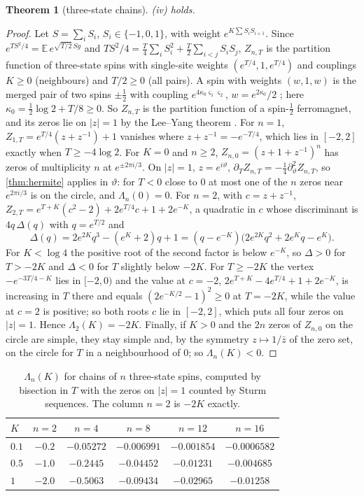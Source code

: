\documentclass[11pt]{article}
\newtheorem{theorem}{Theorem}[section]
\theoremstyle{definition}\newtheorem{definition}[theorem]{Definition}
\theoremstyle{remark}\newtheorem{remark}[theorem]{Remark}
\begin{document}
\begin{theorem}[three-state chains]\label{thm:spins}
(iv) holds.
\end{theorem}
\begin{proof}
Let $S=\sum_iS_i$, $S_i\in\{-1,0,1\}$, with weight $e^{K\sum S_iS_{i+1}}$. Since $e^{TS^2/4}=\mathbb E\,e^{\sqrt{T/2}\,Sg}$ and $TS^2/4=\frac T4\sum_iS_i^2+\frac T2\sum_{i<j}S_iS_j$, $Z_{n,T}$ is the partition function of three-state spins with single-site weights $(e^{T/4},1,e^{T/4})$ and couplings $K\ge0$ (neighbours) and $T/2\ge0$ (all pairs). A spin with weights $(w,1,w)$ is the merged pair of two spins $\pm\frac12$ with coupling $e^{4\kappa_0\varsigma_1\varsigma_2}$, $w=e^{2\kappa_0}/2$ \cite{S01}; here $\kappa_0=\frac12\log2+T/8\ge0$. So $Z_{n,T}$ is the partition function of a spin-$\frac12$ ferromagnet, and its zeros lie on $|z|=1$ by the Lee--Yang theorem \cite{LeeYang,Griffiths69}. For $n=1$, $Z_{1,T}=e^{T/4}(z+z^{-1})+1$ vanishes where $z+z^{-1}=-e^{-T/4}$, which lies in $[-2,2]$ exactly when $T\ge-4\log2$. For $K=0$ and $n\ge2$, $Z_{n,0}=(z+1+z^{-1})^n$ has zeros of multiplicity $n$ at $e^{\pm2\pi i/3}$. On $|z|=1$, $z=e^{i\vartheta}$, $\partial_TZ_{n,T}=-\frac14\partial_\vartheta^2Z_{n,T}$, so \cref{thm:hermite} applies in $\vartheta$: for $T<0$ close to $0$ at most one of the $n$ zeros near $e^{2\pi i/3}$ is on the circle, and $\Lambda_n(0)=0$. For $n=2$, with $c=z+z^{-1}$, $Z_{2,T}=e^{T+K}(c^2-2)+2e^{T/4}c+1+2e^{-K}$, a quadratic in $c$ whose discriminant is $4q\,\Delta(q)$ with $q=e^{T/2}$ and
\[
\Delta(q)=2e^{2K}q^3-(e^K+2)q+1=(q-e^{-K})\bigl(2e^{2K}q^2+2e^Kq-e^K\bigr).
\]
For $K<\log4$ the positive root of the second factor is below $e^{-K}$, so $\Delta>0$ for $T>-2K$ and $\Delta<0$ for $T$ slightly below $-2K$. For $T\ge-2K$ the vertex $-e^{-3T/4-K}$ lies in $[-2,0)$ and the value at $c=-2$, $2e^{T+K}-4e^{T/4}+1+2e^{-K}$, is increasing in $T$ there and equals $(2e^{-K/2}-1)^2\ge0$ at $T=-2K$, while the value at $c=2$ is positive; so both roots $c$ lie in $[-2,2]$, which puts all four zeros on $|z|=1$. Hence $\Lambda_2(K)=-2K$. Finally, if $K>0$ and the $2n$ zeros of $Z_{n,0}$ on the circle are simple, they stay simple and, by the symmetry $z\mapsto1/\bar z$ of the zero set, on the circle for $T$ in a neighbourhood of $0$; so $\Lambda_n(K)<0$.
\end{proof}

\begin{table}[h]\centering\small
\begin{tabular}{@{}lccccc@{}}\toprule
$K$ & $n=2$ & $n=4$ & $n=8$ & $n=12$ & $n=16$\\\midrule
$0.1$ & $-0.2$ & $-0.05272$ & $-0.006991$ & $-0.001854$ & $-0.0006582$\\
$0.5$ & $-1.0$ & $-0.2445$ & $-0.04452$ & $-0.01231$ & $-0.004685$\\
$1$ & $-2.0$ & $-0.5063$ & $-0.09434$ & $-0.02965$ & $-0.01258$\\\bottomrule
\end{tabular}
\caption{$\Lambda_n(K)$ for chains of $n$ three-state spins, computed by bisection in $T$ with the zeros on $|z|=1$ counted by Sturm sequences. The column $n=2$ is $-2K$ exactly.}\label{tab:spins}
\end{table}
\end{document}
